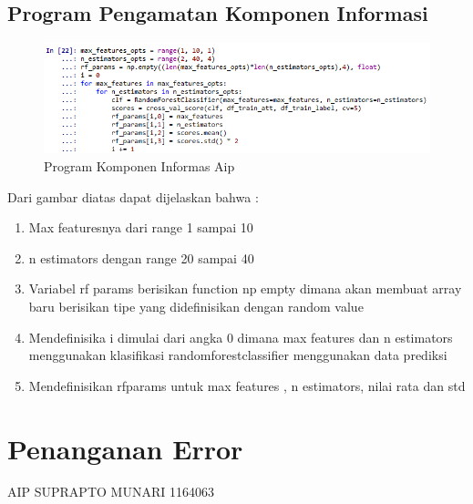 \subsection{Program Pengamatan Komponen Informasi}
\begin{figure}[ht]
\centering
\includegraphics[scale=0.5]{figures/AIP/c11.PNG}
\caption{Program Komponen Informas Aip}
\label{Praktek}
\end{figure}
Dari gambar diatas dapat dijelaskan bahwa :
\begin{enumerate}
\item Max featuresnya dari range 1 sampai 10
\item n estimators dengan range 20 sampai 40
\item Variabel rf params berisikan function np empty dimana akan membuat array baru berisikan tipe yang didefinisikan dengan random value
\item Mendefinisika i dimulai dari angka 0 dimana max features dan n estimators menggunakan klasifikasi randomforestclassifier menggunakan data prediksi
\item Mendefinisikan rfparams untuk max features , n estimators, nilai rata dan std
\end{enumerate}

\section{Penanganan Error}
AIP SUPRAPTO MUNARI 1164063
